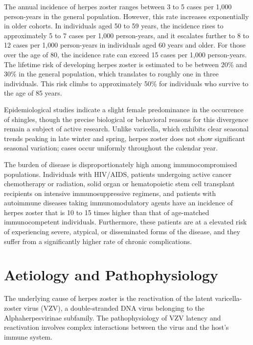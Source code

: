 The annual incidence of herpes zoster ranges between 3 to 5 cases per 1,000 person-years in the general population. However, this rate increases exponentially in older cohorts. In individuals aged 50 to 59 years, the incidence rises to approximately 5 to 7 cases per 1,000 person-years, and it escalates further to 8 to 12 cases per 1,000 person-years in individuals aged 60 years and older. For those over the age of 80, the incidence rate can exceed 15 cases per 1,000 person-years. The lifetime risk of developing herpes zoster is estimated to be between 20\% and 30\% in the general population, which translates to roughly one in three individuals. This risk climbs to approximately 50\% for individuals who survive to the age of 85 years.

Epidemiological studies indicate a slight female predominance in the occurrence of shingles, though the precise biological or behavioral reasons for this divergence remain a subject of active research. Unlike varicella, which exhibits clear seasonal trends peaking in late winter and spring, herpes zoster does not show significant seasonal variation; cases occur uniformly throughout the calendar year.

The burden of disease is disproportionately high among immunocompromised populations. Individuals with HIV/AIDS, patients undergoing active cancer chemotherapy or radiation, solid organ or hematopoietic stem cell transplant recipients on intensive immunosuppressive regimens, and patients with autoimmune diseases taking immunomodulatory agents have an incidence of herpes zoster that is 10 to 15 times higher than that of age-matched immunocompetent individuals. Furthermore, these patients are at a elevated risk of experiencing severe, atypical, or disseminated forms of the disease, and they suffer from a significantly higher rate of chronic complications.

\section{Aetiology and Pathophysiology}
The underlying cause of herpes zoster is the reactivation of the latent varicella-zoster virus (VZV), a double-stranded DNA virus belonging to the Alphaherpesvirinae subfamily. The pathophysiology of VZV latency and reactivation involves complex interactions between the virus and the host's immune system.

